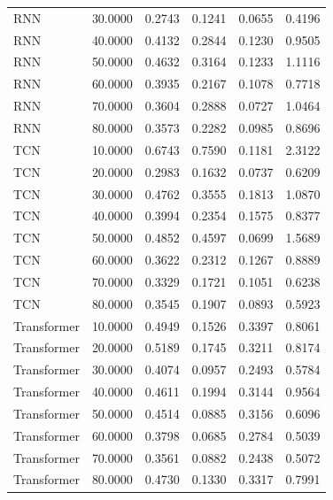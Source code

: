 \begin{tabular}{lrrrrr}
RNN & 30.0000 & 0.2743 & 0.1241 & 0.0655 & 0.4196 \\
RNN & 40.0000 & 0.4132 & 0.2844 & 0.1230 & 0.9505 \\
RNN & 50.0000 & 0.4632 & 0.3164 & 0.1233 & 1.1116 \\
RNN & 60.0000 & 0.3935 & 0.2167 & 0.1078 & 0.7718 \\
RNN & 70.0000 & 0.3604 & 0.2888 & 0.0727 & 1.0464 \\
RNN & 80.0000 & 0.3573 & 0.2282 & 0.0985 & 0.8696 \\
TCN & 10.0000 & 0.6743 & 0.7590 & 0.1181 & 2.3122 \\
TCN & 20.0000 & 0.2983 & 0.1632 & 0.0737 & 0.6209 \\
TCN & 30.0000 & 0.4762 & 0.3555 & 0.1813 & 1.0870 \\
TCN & 40.0000 & 0.3994 & 0.2354 & 0.1575 & 0.8377 \\
TCN & 50.0000 & 0.4852 & 0.4597 & 0.0699 & 1.5689 \\
TCN & 60.0000 & 0.3622 & 0.2312 & 0.1267 & 0.8889 \\
TCN & 70.0000 & 0.3329 & 0.1721 & 0.1051 & 0.6238 \\
TCN & 80.0000 & 0.3545 & 0.1907 & 0.0893 & 0.5923 \\
Transformer & 10.0000 & 0.4949 & 0.1526 & 0.3397 & 0.8061 \\
Transformer & 20.0000 & 0.5189 & 0.1745 & 0.3211 & 0.8174 \\
Transformer & 30.0000 & 0.4074 & 0.0957 & 0.2493 & 0.5784 \\
Transformer & 40.0000 & 0.4611 & 0.1994 & 0.3144 & 0.9564 \\
Transformer & 50.0000 & 0.4514 & 0.0885 & 0.3156 & 0.6096 \\
Transformer & 60.0000 & 0.3798 & 0.0685 & 0.2784 & 0.5039 \\
Transformer & 70.0000 & 0.3561 & 0.0882 & 0.2438 & 0.5072 \\
Transformer & 80.0000 & 0.4730 & 0.1330 & 0.3317 & 0.7991 \\
\bottomrule
\end{tabular}
